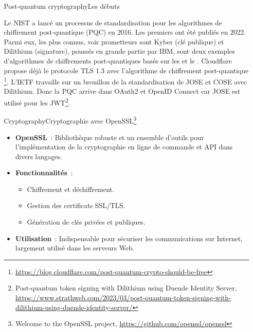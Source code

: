 \documentclass{beamer}
\begin{document}
    \begin{frame}{Post-quantum cryptography}{Les débuts}
        \begin{footnotesize}
            Le NIST a lancé un processus de standardisation pour les algorithmes de chiffrement post-quantique (PQC) en 2016.
            Les premiers ont été publiés en 2022.
            Parmi eux, les plus connus, voir prometteurs sont Kyber (clé publique) et Dilithium (signature), poussés en grande partie par IBM, sont deux exemples d'algorithmes de chiffrements post-quantiques basés sur les  et le .
            \bigbreak
            Cloudflare propose déjà le protocole TLS 1.3 avec l'algorithme de chiffrement post-quantique \footnote{\url{https://blog.cloudflare.com/post-quantum-crypto-should-be-free}}.
            \bigbreak
            L'IETF travaille sur un brouillon de la standardisation de JOSE et COSE avec Dilithium.
            Donc la PQC arrive dans OAuth2 et OpenID Connect car JOSE est utilisé pour les JWT\footnote{Post-quantum token signing with Dilithium using Duende Identity Server, \url{https://www.strathweb.com/2023/03/post-quantum-token-signing-with-dilithium-using-duende-identity-server/}}.
        \end{footnotesize}
    \end{frame}

    \begin{frame}{Cryptography}{Cryptographie avec OpenSSL\footnote{Welcome to the OpenSSL project, \url{https://github.com/openssl/openssl}}}
        \begin{itemize}
            \item \textbf{OpenSSL}~: Bibliothèque robuste et un ensemble d'outils pour l'implémentation de la cryptographie en ligne de commande et API dans divers langages.
            \item \textbf{Fonctionnalités}~:
            \begin{itemize}
                \item Chiffrement et déchiffrement.
                \item Gestion des certificats SSL/TLS.
                \item Génération de clés privées et publiques.
            \end{itemize}
            \item \textbf{Utilisation}~: Indispensable pour sécuriser les communications sur Internet, largement utilisé dans les serveurs Web.
        \end{itemize}
    \end{frame}
\end{document}
